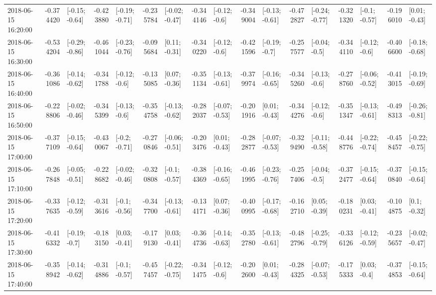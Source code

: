 \begin{tabular}{lrlrlrlrlrlrlrlrl}
2018-06-15 16:20:00 & -0.374420 &  [-0.15; -0.64] & -0.423880 &  [-0.19; -0.71] & -0.235784 &  [-0.02; -0.47] & -0.344146 &   [-0.12; -0.6] & -0.349004 &  [-0.13; -0.61] & -0.472827 &  [-0.24; -0.77] & -0.321320 &   [-0.1; -0.57] & -0.196010 &   [0.01; -0.43] \\
2018-06-15 16:30:00 & -0.534204 &  [-0.29; -0.86] & -0.461044 &  [-0.23; -0.76] & -0.095684 &   [0.11; -0.31] & -0.340220 &   [-0.12; -0.6] & -0.421596 &   [-0.19; -0.7] & -0.257577 &   [-0.04; -0.5] & -0.344110 &   [-0.12; -0.6] & -0.406600 &  [-0.18; -0.68] \\
2018-06-15 16:40:00 & -0.361086 &  [-0.14; -0.62] & -0.341788 &   [-0.12; -0.6] & -0.135085 &   [0.07; -0.36] & -0.351134 &  [-0.13; -0.61] & -0.379974 &  [-0.16; -0.65] & -0.345260 &   [-0.13; -0.6] & -0.278760 &  [-0.06; -0.52] & -0.413015 &  [-0.19; -0.69] \\
2018-06-15 16:50:00 & -0.228806 &  [-0.02; -0.46] & -0.345399 &   [-0.13; -0.6] & -0.354758 &  [-0.13; -0.62] & -0.282037 &  [-0.07; -0.53] & -0.201916 &   [0.01; -0.43] & -0.344276 &   [-0.12; -0.6] & -0.351347 &  [-0.13; -0.61] & -0.498313 &  [-0.26; -0.81] \\
2018-06-15 17:00:00 & -0.377109 &  [-0.15; -0.64] & -0.430067 &   [-0.2; -0.71] & -0.270846 &  [-0.06; -0.51] & -0.203476 &   [0.01; -0.43] & -0.282877 &  [-0.07; -0.53] & -0.329490 &  [-0.11; -0.58] & -0.448776 &  [-0.22; -0.74] & -0.458457 &  [-0.22; -0.75] \\
2018-06-15 17:10:00 & -0.267848 &  [-0.05; -0.51] & -0.228682 &  [-0.02; -0.46] & -0.320808 &   [-0.1; -0.57] & -0.384369 &  [-0.16; -0.65] & -0.461995 &  [-0.23; -0.76] & -0.257406 &   [-0.04; -0.5] & -0.372477 &  [-0.15; -0.64] & -0.370840 &  [-0.15; -0.64] \\
2018-06-15 17:20:00 & -0.337635 &  [-0.12; -0.59] & -0.313616 &   [-0.1; -0.56] & -0.347700 &  [-0.13; -0.61] & -0.134171 &   [0.07; -0.36] & -0.400995 &  [-0.17; -0.68] & -0.162710 &   [0.05; -0.39] & -0.180231 &   [0.03; -0.41] & -0.104875 &    [0.1; -0.32] \\
2018-06-15 17:30:00 & -0.416332 &   [-0.19; -0.7] & -0.183150 &   [0.03; -0.41] & -0.179130 &   [0.03; -0.41] & -0.364736 &  [-0.14; -0.63] & -0.352780 &  [-0.13; -0.61] & -0.482796 &  [-0.25; -0.79] & -0.336126 &  [-0.12; -0.59] & -0.235657 &  [-0.02; -0.47] \\
2018-06-15 17:40:00 & -0.358942 &  [-0.14; -0.62] & -0.314886 &   [-0.1; -0.57] & -0.457457 &  [-0.22; -0.75] & -0.341475 &   [-0.12; -0.6] & -0.202600 &   [0.01; -0.43] & -0.284325 &  [-0.07; -0.53] & -0.175333 &    [0.03; -0.4] & -0.374853 &  [-0.15; -0.64] \\

\end{tabular}
